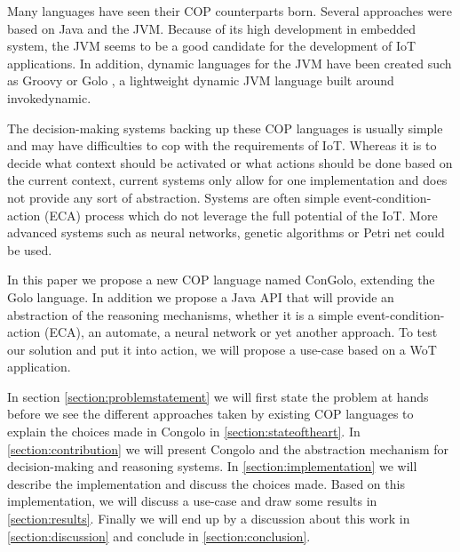 \documentclass[a4paper]{article}
\begin{document}
Many languages have seen their COP counterparts born. Several approaches were based on Java and the JVM. Because of its high development in embedded system, the JVM seems to be a good candidate for the development of IoT applications. In addition, dynamic languages for the JVM have been created such as Groovy or Golo \cite{ponge_golo_2013}, a lightweight dynamic JVM language built around invokedynamic.

The decision-making systems backing up these COP languages is usually simple and may have difficulties to cop with the requirements of IoT. Whereas it is to decide what context should be activated or what actions should be done based on the current context, current systems only allow for one implementation and does not provide any sort of abstraction. Systems are often simple event-condition-action (ECA) process which do not leverage the full potential of the IoT. More advanced systems such as neural networks, genetic algorithms or Petri net could be used.

In this paper we propose a new COP language named ConGolo, extending the Golo language. In addition we propose a Java API that will provide an abstraction of the reasoning mechanisms, whether it is a simple event-condition-action (ECA), an automate, a neural network or yet another approach. To test our solution and put it into action, we will propose a use-case based on a WoT application.

In section \ref{section:problemstatement} we will first state the problem at hands before we see the different approaches taken by existing COP languages to explain the choices made in Congolo in \ref{section:stateoftheart}. In \ref{section:contribution} we will present Congolo and the abstraction mechanism for decision-making and reasoning systems. In \ref{section:implementation} we will describe the implementation and discuss the choices made. Based on this implementation, we will discuss a use-case and draw  some results in \ref{section:results}. Finally we will end up by a  discussion about this work in \ref{section:discussion} and conclude in \ref{section:conclusion}.
\end{document}
